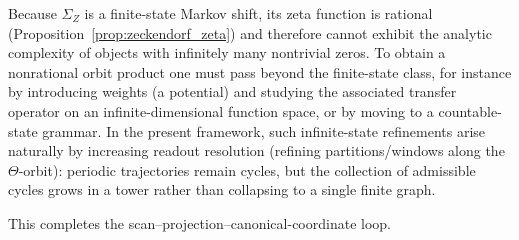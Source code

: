 \begin{remark}
Because $\Sigma_Z$ is a finite-state Markov shift, its zeta function is rational (Proposition~\ref{prop:zeckendorf_zeta}) and therefore cannot exhibit the analytic complexity of objects with infinitely many nontrivial zeros. To obtain a nonrational orbit product one must pass beyond the finite-state class, for instance by introducing weights (a potential) and studying the associated transfer operator on an infinite-dimensional function space, or by moving to a countable-state grammar. In the present framework, such infinite-state refinements arise naturally by increasing readout resolution (refining partitions/windows along the $\Theta$-orbit): periodic trajectories remain cycles, but the collection of admissible cycles grows in a tower rather than collapsing to a single finite graph.
\end{remark}

This completes the scan--projection--canonical-coordinate loop.
